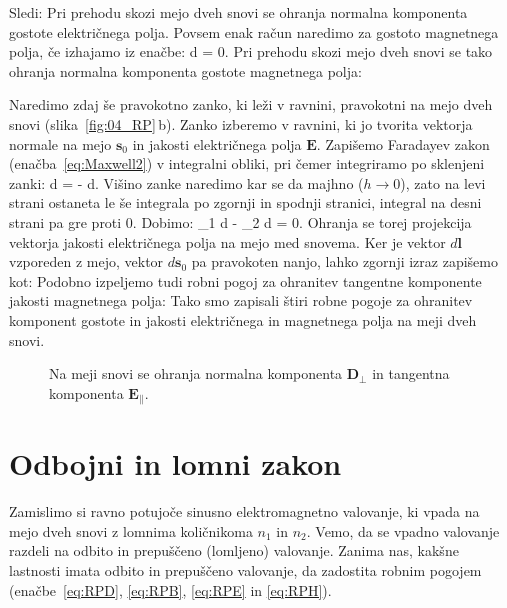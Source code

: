 Sledi:
Pri prehodu skozi mejo dveh snovi se ohranja normalna komponenta gostote
električnega polja. Povsem enak račun naredimo za gostoto magnetnega polja, 
če izhajamo iz enačbe:
\beq
\oint {}\cdot d = 0.
\label{eq:04_03}
\eeq
Pri prehodu skozi mejo dveh snovi se tako ohranja normalna komponenta
gostote magnetnega polja:

Naredimo zdaj še pravokotno zanko, ki leži v ravnini, pravokotni na mejo dveh 
snovi (slika~\ref{fig:04_RP}\,b). Zanko izberemo v ravnini, ki jo tvorita vektorja normale na 
mejo $\mathbf{s}_0$ in jakosti električnega polja $\mathbf{E}$. 
Zapišemo Faradayev zakon (enačba~\ref{eq:Maxwell2}) v integralni obliki, pri 
čemer integriramo po sklenjeni zanki:
\beq
\oint {}\cdot d = - \int {}\cdot d.
\label{eq:04_04}
\eeq
Višino zanke naredimo kar se da majhno ($h \to 0$), zato na levi strani ostaneta le še 
integrala po zgornji in spodnji stranici, integral na desni strani pa gre proti 0. Dobimo:
\beq
{}_1 \cdot d - _2 \cdot d = 0.
\label{eq:04_05}
\eeq
Ohranja se torej projekcija vektorja jakosti električnega polja na mejo med snovema. 
Ker je vektor $d\mathbf{l}$ vzporeden z mejo, vektor $d\mathbf{s}_0$ pa 
pravokoten nanjo, lahko zgornji izraz zapišemo kot:
Podobno izpeljemo tudi robni pogoj za ohranitev tangentne komponente
jakosti magnetnega polja:
Tako smo zapisali štiri robne pogoje za ohranitev komponent gostote in jakosti električnega
in magnetnega polja na meji dveh snovi. 
\begin{figure}[!h]
\centering
\def\svgwidth{80truemm} 

\caption{Na meji snovi se ohranja normalna komponenta $\mathbf{D}_\perp$ in tangentna komponenta 
$\mathbf{E}_\parallel$.}
\label{fig:04_RP2}
\end{figure}

\section{Odbojni in lomni zakon}
Zamislimo si ravno potujoče sinusno elektromagnetno valovanje, 
ki vpada na mejo dveh snovi z lomnima količnikoma $n_1$ in $n_2$. 
Vemo, da se vpadno valovanje razdeli na odbito in prepuščeno (lomljeno) 
valovanje. Zanima nas, kakšne lastnosti imata odbito in prepuščeno 
valovanje, da zadostita robnim pogojem (enačbe~\ref{eq:RPD}, \ref{eq:RPB}, 
\ref{eq:RPE} in \ref{eq:RPH}). 

